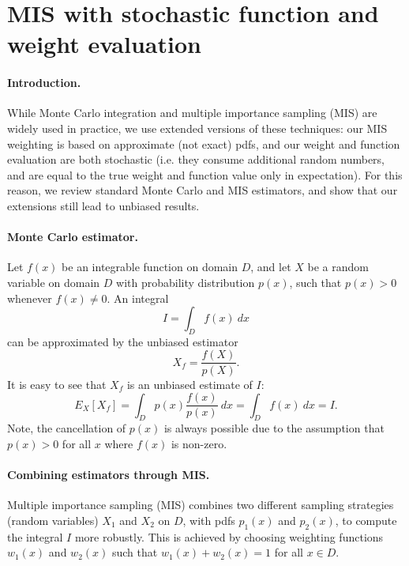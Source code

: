 \section{MIS with stochastic function and weight evaluation}
\label{sec:layeredbsdf:weight_computation}

\paragraph{Introduction.}

While Monte	Carlo integration and multiple importance sampling (MIS) are widely used in practice, we use extended versions of these techniques: our MIS weighting is based on approximate (not exact) pdfs, and our weight and function evaluation are both stochastic (i.e. they consume additional random numbers, and are  equal to the true weight and function value only in expectation). For this reason, we review standard Monte Carlo and MIS estimators, and show that our extensions still lead to unbiased results.


\paragraph{Monte Carlo estimator.}

Let $f(x)$ be an integrable function on domain $D$, and let $X$ be a random variable on domain $D$ with probability distribution $p(x)$, such that $p(x) > 0$ whenever $f(x) \neq 0$. An integral
\begin{equation}
I = \int_D f(x) \ dx
\end{equation}
can be approximated by the unbiased estimator
\begin{equation}
X_f = \frac{f(X)}{p(X)}.
\end{equation}
It is easy to see that $X_f$ is an unbiased estimate of $I$:
\begin{equation}
E_X[X_f] = \int_D p(x) \frac{f(x)}{p(x)} \ dx = \int_D f(x) \ dx = I.
\end{equation}
Note, the cancellation of $p(x)$ is always possible due to the assumption that $p(x) > 0$ for all $x$ where $f(x)$ is non-zero.


\paragraph{Combining estimators through MIS.}

Multiple importance sampling (MIS) combines two different sampling strategies (random variables) $X_1$ and $X_2$ on $D$, with pdfs $p_1(x)$ and $p_2(x)$, to compute the integral $I$ more robustly. This is achieved by choosing weighting functions $w_1(x)$ and $w_2(x)$ such that $w_1(x) + w_2(x) = 1$ for all $x \in D$.

